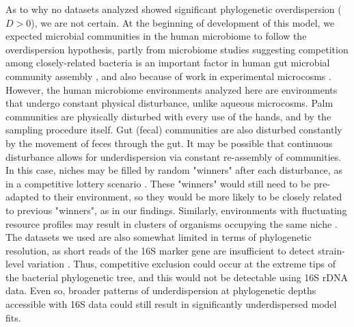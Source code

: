 \documentclass{article}
\begin{document}
As to why no datasets analyzed showed significant phylogenetic overdispersion (\(D > 0\)), we are not certain. At the beginning of development of this model, we expected microbial communities in the human microbiome to follow the overdispersion hypothesis, partly from microbiome studies suggesting competition among closely-related bacteria is an important factor in human gut microbial community assembly \cite{Chatzidaki-Livanis3627,Hecht1281,Nemergut2013}, and also because of work in experimental microcosms \cite{Peay2012}. However, the human microbiome environments analyzed here are environments that undergo constant physical disturbance, unlike aqueous microcosms. Palm communities are physically disturbed with every use of the hands, and by the sampling procedure itself. Gut (fecal) communities are also disturbed constantly by the movement of feces through the gut. It may be possible that continuous disturbance allows for underdispersion via constant re-assembly of communities. In this case, niches may be filled by random "winners" after each disturbance, as in a competitive lottery scenario \cite{Verster2018}. These "winners" would still need to be pre-adapted to their environment, so they would be more likely to be closely related to previous "winners", as in our findings. Similarly, environments with fluctuating resource profiles may result in clusters of organisms occupying the same niche \cite{Sakavara738}. The datasets we used are also somewhat limited in terms of phylogenetic resolution, as short reads of the 16S marker gene are insufficient to detect strain-level variation \cite{Morowitz1128,Hecht1281,Tett2019}. Thus, competitive exclusion could occur at the extreme tips of the bacterial phylogenetic tree, and this would not be detectable using 16S rDNA data. Even so, broader patterns of underdispersion at phylogenetic depths accessible with 16S data could still result in significantly underdispersed model fits.
\par
\end{document}
